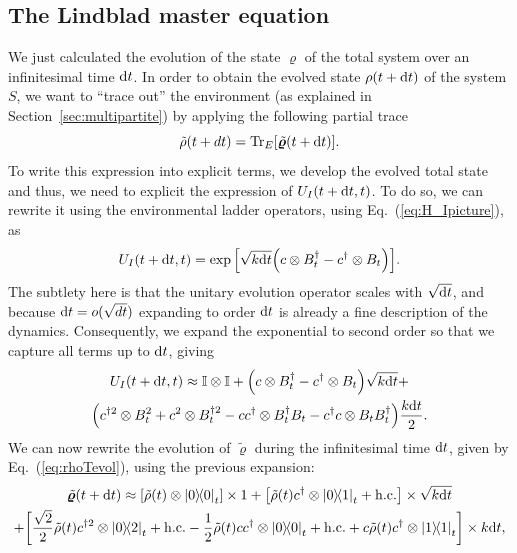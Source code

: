 \subsection{The Lindblad master equation}
We just calculated the evolution of the state $\bm{\varrho}$ of the total system over an infinitesimal time $\mathrm{d}t$. In order to obtain the evolved state $\rho(t+\mathrm{d}t)$ of the system $S$, we want to ``trace out'' the environment (as explained in Section~\ref{sec:multipartite}) by applying the following partial trace
\begin{equation}\label{eq:rhoSTrace}
    \tilde{\rho}(t+dt) = \mathrm{Tr}_E\qty[\tilde{\bm{\varrho}}(t+\mathrm{d}t)].
\end{equation}
To write this expression into explicit terms, we develop the evolved total state and thus, we need to explicit the expression of $U_I(t+\mathrm{d}t,t)$. To do so, we can rewrite it using the environmental ladder operators, using Eq.~(\ref{eq:H_Ipicture}), as 
\begin{equation}
    U_I(t+\mathrm{d}t,t)=\exp\qty[\sqrt{k\mathrm{d}t}\qty(c\otimes B_t^\dagger-c^\dagger\otimes B_t)].
\end{equation}
The subtlety here is that the unitary evolution operator scales with $\sqrt{\mathrm{d}t}$, and because $\mathrm{d}t=o(\sqrt{dt})$ expanding to order $\mathrm{d}t$ is already a fine description of the dynamics. Consequently, we expand the exponential to second order so that we capture all terms up to $\mathrm{d}t$, giving
\begin{multline}
    U_I(t+\mathrm{d}t,t)\approx\mathbb{I}\otimes\mathbb{I}+\qty(c\otimes B_t^\dagger-c^\dagger\otimes B_t)\sqrt{k\mathrm{d}t}+\\
    \qty(c^{\dagger 2}\otimes B_t^2 + c^2\otimes B_t^{\dagger 2}-c c^\dagger\otimes B_t^\dagger B_t - c^\dagger c\otimes B_t B_t^\dagger)\frac{k\mathrm{d}t}{2}.
\end{multline}
We can now rewrite the evolution of $\tilde{\bm{\varrho}}$ during the infinitesimal time $\mathrm{d}t$, given by Eq.~(\ref{eq:rhoTevol}), using the previous expansion:
\begin{multline}\label{eq:expansion}
    \tilde{\bm{\varrho}}(t+\mathrm{d}t)\approx \qty[\tilde{\rho}(t)\otimes\ketbra{0}_t]\times 1
    +\qty[\tilde{\rho}(t) c^\dagger\otimes\ketbra{0}{1}_t+\mathrm{h.c.}]\times\sqrt{k\mathrm{d}t}\\
    +\qty[\frac{\sqrt{2}}{2}\tilde{\rho}(t) c^{\dagger 2}\otimes\ketbra{0}{2}_t+\mathrm{h.c.}-\frac{1}{2}\tilde{\rho}(t) c c^\dagger\otimes\ketbra{0}_t+\mathrm{h.c.}+c\tilde{\rho}(t) c^\dagger\otimes\ketbra{1}_t]\times k\mathrm{d}t,
\end{multline}
